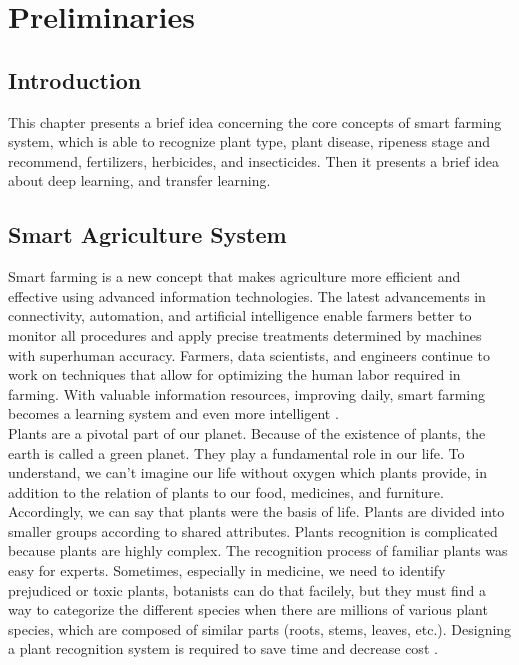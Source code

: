 \chapter{Preliminaries}

\section{Introduction}

This chapter presents a brief idea concerning the core concepts of 
smart farming system, which is able to recognize plant type, plant 
disease, ripeness stage and recommend, fertilizers, herbicides, and 
insecticides. Then it presents a brief idea about deep learning, 
and transfer learning.


\section{Smart Agriculture System}
Smart farming is a new concept that makes agriculture more efficient
and effective using advanced information technologies. The latest 
advancements in connectivity, automation, and artificial intelligence
enable farmers better to monitor all procedures and apply precise 
treatments determined by machines with superhuman accuracy. Farmers, 
data scientists, and engineers continue to work on techniques that allow 
for optimizing the human labor required in farming. With valuable information 
resources, improving daily, smart farming becomes a learning system and even 
more intelligent \cite{una20}. \\

Plants are a pivotal part of our planet. Because of the existence of plants, 
the earth is called a green planet. They play a fundamental role in our life. 
To understand, we can't imagine our life without oxygen which plants provide, 
in addition to the relation of plants to our food, medicines, and furniture. 
Accordingly, we can say that plants were the basis of life. Plants are divided 
into smaller groups according to shared attributes. Plants recognition is complicated 
because plants are highly complex. The recognition process of familiar plants was easy 
for experts. Sometimes, especially in medicine, we need to identify prejudiced or toxic 
plants, botanists can do that facilely, but they must find a way to categorize the different 
species when there are millions of various plant species, which are composed of similar parts 
(roots, stems, leaves, etc.). Designing a plant recognition system is required to save time 
and decrease cost \cite{has18}. \\

